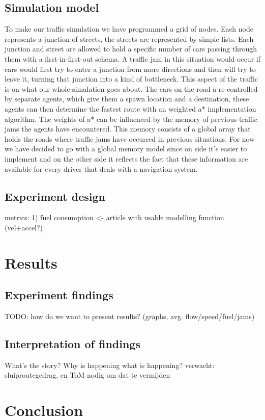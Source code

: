 \documentclass[a4paper,hidelinks]{article}
\begin{document}
\subsection{Simulation model}
To make our traffic simulation we have programmed a grid of nodes. Each node represents a junction of streets, the streets are represented by simple lists. Each junction and street are allowed to hold a specific number of cars passing through them with a first-in-first-out schema. A traffic jam in this situation would occur if cars would first try to enter a junction from more directions and then will try to leave it, turning that junction into a kind of bottleneck. This aspect of the traffic is on what our whole simulation goes about. The cars on the road a re-controlled by separate agents, which give them a spawn location and a destination, these agents can then determine the fastest route with an weighted a* implementation algorithm. The weights of a* can be influenced by the memory of previous traffic jams the agents have encountered. This memory consists of a global array that holds the roads where traffic jams have occurred in previous situations. For now we have decided to go with a global memory model since on side it's easier to implement and on the other side it reflects the fact that these information are available for every driver that deals with a navigation system. 

\subsection{Experiment design}
metrics: 1) fuel consumption <- article with usable modelling function (vel+accel?)

\section{Results}
\subsection{Experiment findings}
TODO: how do we want to present results? (graphs, avg. flow/speed/fuel/jams)

\subsection{Interpretation of findings}
What's the story? Why is happening what is happening? verwacht: sluiproutegedrag, en ToM nodig om dat te vermijden

\section{Conclusion}
\end{document}
